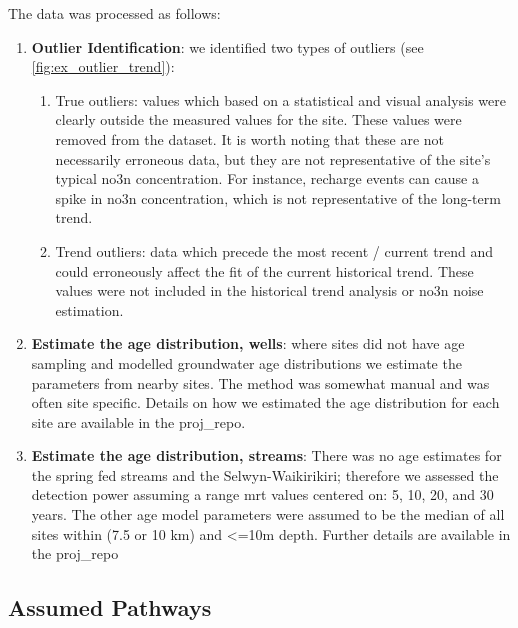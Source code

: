The data was processed as follows:
\begin{enumerate}
    \item \textbf{Outlier Identification}: we identified two types of outliers (see \autoref{fig:ex_outlier_trend}):
    \begin{enumerate}
        \item  True outliers: values which based on a statistical and visual analysis were clearly outside the measured values for the site. These values were removed from the dataset. It is worth noting that these  are not necessarily erroneous data, but they are not representative of the site's typical \gls{no3n} concentration. For instance, recharge events can cause a spike in \gls{no3n} concentration, which is not representative of the long-term trend.
        \item Trend outliers: data which precede the most recent / current trend and could erroneously affect the fit of the current historical trend. These values were not included in the historical trend analysis or \gls{no3n} noise estimation.
    \end{enumerate}
    \item \textbf{Estimate the age distribution, wells}: where sites did not have age sampling and modelled groundwater age distributions we estimate the parameters from nearby sites. The method was somewhat manual and was often site specific. Details on how we estimated the age distribution for each site are available in the \gls{proj_repo}.
    \item \textbf{Estimate the age distribution, streams}: There was no age estimates for the spring fed streams and the Selwyn-Waikirikiri; therefore we assessed the detection power assuming a range \gls{mrt} values centered on: 5, 10, 20, and 30 years. The other age model parameters were assumed to be the median of all sites within (7.5 or 10 km) and <=10m depth. Further details are available in the \gls{proj_repo}
\end{enumerate}

\begin{landscape}
\end{landscape}


\subsection[Pathways]{Assumed Pathways} \label{subsec:apriori}

